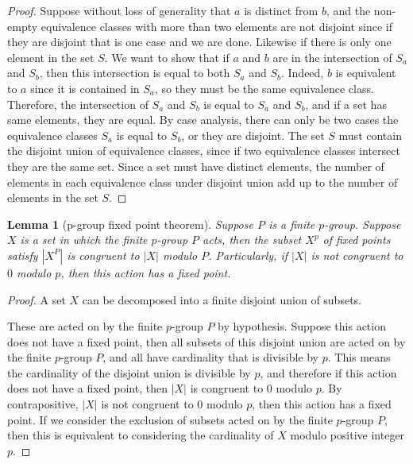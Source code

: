 \documentclass{tufte-book}
\newtheorem{lemma}[theorem]{Lemma}
\begin{document}
\begin{proof}
  Suppose without loss of generality that $a$ is distinct from $b$, and the non-empty equivalence classes
  with more than two elements are not disjoint since if they are disjoint that is one case and we are done.
  Likewise if there is only one element in the set $S$.
  We want to show that if $a$ and $b$ are in the intersection of $S_{a}$ and $S_{b}$, then this intersection is equal to
  both $S_a$ and $S_b$. Indeed, $b$ is equivalent to $a$ since it is contained in $S_a$, so they must be the same equivalence class.
  Therefore, the intersection of $S_{a}$ and $S_{b}$ is equal to $S_a$ and $S_b$, and if a set has same elements, they are equal.
  By case analysis, there can only be two cases the equivalence classes $S_a$ is equal to $S_b$, or they are disjoint.
  The set $S$ must contain the disjoint union of equivalence classes, since if two equivalence classes intersect they are the same set.
  Since a set must have distinct elements, the number of elements in each equivalence class under disjoint union add up to the number of elements in the set $S$.
\end{proof}

\begin{lemma}[p-group fixed point theorem]\label{lem:p-group-fixed-point-theorem}
  Suppose $P$ is a finite $p$-group.
  Suppose $X$ is a set in which the finite $p$-group $P$ acts, then the subset $X^{p}$ of fixed points satisfy $|X^P|$ is congruent to $|X|$ modulo $P$. Particularly, if $|X|$ is not congruent to $0$ modulo $p$, then this action has a fixed point. 
\end{lemma}

\begin{proof}
  A set $X$ can be decomposed into a finite disjoint union of subsets.

  These are acted on by the finite $p$-group $P$ by hypothesis. Suppose this action does not have a fixed point, then all subsets of this disjoint union are acted on by the finite $p$-group $P$, and all have cardinality that is divisible by $p$. This means the cardinality of the disjoint union is divisible by $p$, and therefore if this action does not have a fixed point, then $|X|$ is congruent to $0$ modulo $p$. By contrapositive, $|X|$ is not congruent to $0$ modulo $p$, then this action has a fixed point.
  If we consider the exclusion of subsets acted on by the finite $p$-group $P$, then this is equivalent to considering the cardinality of $X$ modulo positive integer $p$.
\end{proof}
\end{document}

